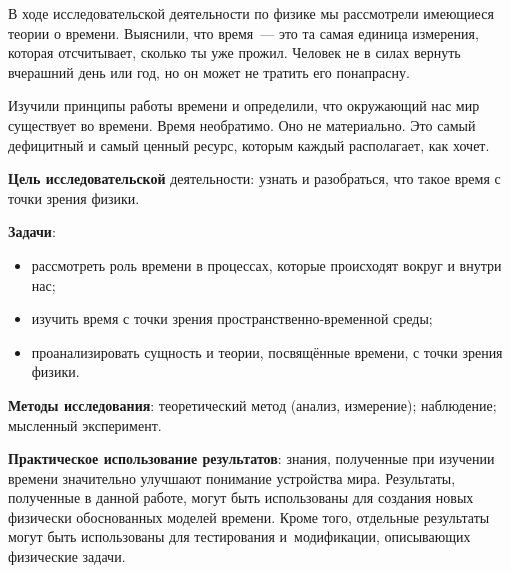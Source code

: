 \bigskip
{}



\makeProcTitleSchool


В ходе исследовательской деятельности по физике мы рассмотрели имеющиеся теории о времени. Выяснили, что время~--- это та самая единица измерения, которая отсчитывает, сколько ты уже прожил. Человек не в силах вернуть вчерашний день или год, но он может не тратить его понапрасну.

Изучили принципы работы времени и определили, что окружающий нас мир существует во времени. Время необратимо. Оно не материально. Это самый дефицитный и самый ценный ресурс, которым каждый располагает, как хочет.

\textbf{Цель исследовательской} деятельности: узнать и разобраться, что такое время с точки зрения физики.

\textbf{Задачи}:
\begin{itemize}[noitemsep]\vspace{-6pt}
\item рассмотреть роль времени в процессах, которые происходят вокруг и внутри нас;
\item изучить время с точки зрения пространственно-временной среды;
\item проанализировать сущность и теории, посвящённые времени, с точки зрения физики.
\end{itemize}\vspace{-6pt}

\textbf{Методы исследования}: теоретический метод (анализ, измерение); наблюдение; мысленный эксперимент.

\textbf{Практическое использование результатов}: знания, полученные при изучении времени значительно улучшают понимание устройства мира. Результаты, полученные в данной работе, могут быть использованы для создания новых физически обоснованных моделей времени. Кроме того, отдельные результаты могут быть использованы для тестирования и~модификации, описывающих физические задачи.
